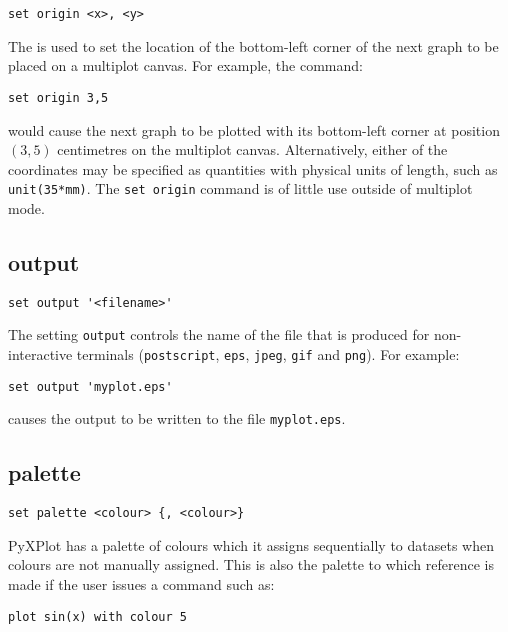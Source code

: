 \begin{verbatim}
set origin <x>, <y>
\end{verbatim}

The  is used to set the location of the bottom-left corner
of the next graph to be placed on a multiplot canvas.  For example, the
command:

\begin{verbatim}
set origin 3,5
\end{verbatim}

\noindent would cause the next graph to be plotted with its bottom-left corner
at position $(3,5)$ centimetres on the multiplot canvas. Alternatively, either
of the coordinates may be specified as quantities with physical units of
length, such as {\tt unit(35*mm)}.  The {\tt set origin} command is of little
use outside of multiplot mode.


\subsection{output}

\begin{verbatim}
set output '<filename>'
\end{verbatim}

The setting {\tt output} controls the name of the file that is produced for
non-interactive terminals ({\tt postscript}, {\tt eps}, {\tt jpeg}, {\tt gif}
and {\tt png}).  For example:

\begin{verbatim}
set output 'myplot.eps'
\end{verbatim}

\noindent causes the output to be written to the file {\tt myplot.eps}.


\subsection{palette}

\begin{verbatim}
set palette <colour> {, <colour>}
\end{verbatim}

PyXPlot has a palette of colours which it assigns sequentially to datasets when
colours are not manually assigned. This is also the palette to which reference
is made if the user issues a command such as:

\begin{verbatim}
plot sin(x) with colour 5
\end{verbatim}

